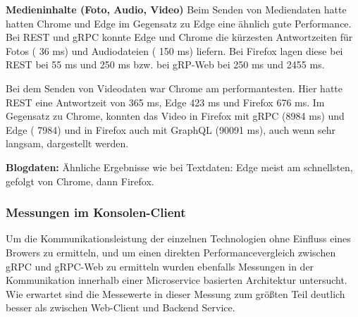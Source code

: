 \textbf{Medieninhalte (Foto, Audio, Video)}  
Beim Senden von Mediendaten hatte hatten Chrome und Edge im Gegensatz zu Edge eine ähnlich gute Performance. Bei REST und gRPC konnte Edge und Chrome die kürzesten Antwortzeiten für Fotos ( 36 ms) und Audiodateien ( 150 ms)  liefern. Bei Firefox lagen diese bei REST bei 55 ms und 250 ms bzw. bei gRP-Web bei 250 ms und 2455 ms.

Bei dem Senden von Videodaten war Chrome am performantesten. Hier hatte REST eine Antwortzeit von 365 ms, Edge 423 ms und Firefox 676 ms. Im Gegensatz zu Chrome, konnten das Video in Firefox mit gRPC (8984 ms) und Edge ( 7984) und in Firefox auch mit GraphQL (90091 ms), auch wenn sehr langsam, dargestellt werden.


\textbf{Blogdaten:}  
Ähnliche Ergebnisse wie bei Textdaten: Edge meist am schnellsten, gefolgt von Chrome, dann Firefox.



\clearpage
\subsubsection{Messungen im Konsolen-Client}
Um die Kommunikationsleistung der einzelnen Technologien ohne Einfluss eines Browers zu ermitteln, und um einen direkten Performancevergleich zwischen gRPC und gRPC-Web zu ermitteln wurden ebenfalls Messungen in der Kommunikation innerhalb einer Microservice basierten Architektur untersucht. Wie erwartet sind die Messewerte in dieser Messung zum größten Teil deutlich besser als zwischen Web-Client und Backend Service.  

